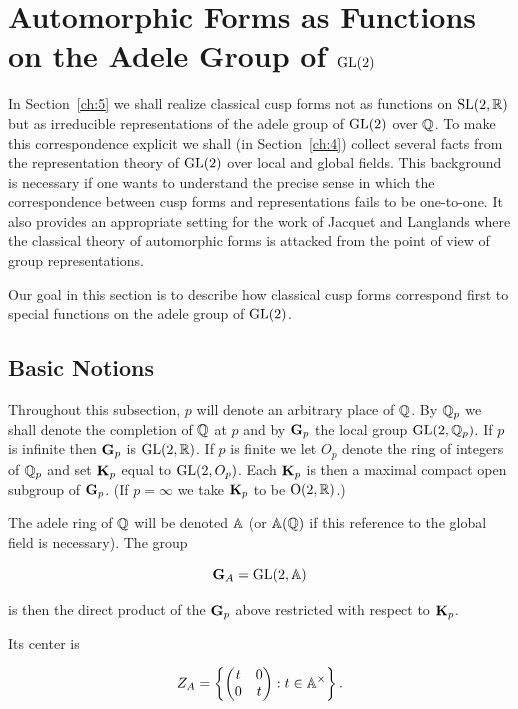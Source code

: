 \chapter{Automorphic Forms as Functions on the Adele Group of \texorpdfstring{$\operatorname{GL}(2)$}{GL(2)}}

\label{ch:3}

In Section~\ref{ch:5} we shall realize classical cusp forms not as functions on $\operatorname{SL}(2,\mathbb{R})$ but as irreducible representations of the adele group of $\operatorname{GL}(2)$ over $\mathbb{Q}$. To make this correspondence explicit we shall (in Section~\ref{ch:4}) collect several facts from the representation theory of $\operatorname{GL}(2)$ over local and global fields. This background is necessary if one wants to understand the precise sense in which the correspondence between cusp forms and representations fails to be one-to-one. It also provides an appropriate setting for the work of Jacquet and Langlands where the classical theory of automorphic forms is attacked from the point of view of group representations.

Our goal in this section is to describe how classical cusp forms correspond first to special functions on the adele group of $\operatorname{GL}(2)$.

\section{Basic Notions}\label{sec:3a}

Throughout this subsection, $p$ will denote an arbitrary place of $\mathbb{Q}$. By $\mathbb{Q}_p$ we shall denote the completion of $\mathbb{Q}$ at $p$ and by $\mathbf{G}_p$ the local group $\operatorname{GL}(2,\mathbb{Q}_p)$. If $p$ is infinite then $\mathbf{G}_p$ is $\operatorname{GL}(2,\mathbb{R})$. If $p$ is finite we let $O_p$ denote the ring of integers of $\mathbb{Q}_p$ and set $\mathbf{K}_p$ equal to $\operatorname{GL}(2,O_p)$. Each $\mathbf{K}_p$ is then a maximal compact open subgroup of $\mathbf{G}_p$. (If $p = \infty$ we take $\mathbf{K}_p$ to be $\operatorname{O}(2,\mathbb{R})$.)

The adele ring of $\mathbb{Q}$ will be denoted $\mathbb{A}$ (or $\mathbb{A}(\mathbb{Q})$ if this reference to the global field is necessary). The group

\[
\mathbf{G}_A = \operatorname{GL}(2,\mathbb{A})
\]

is then the direct product of the $\mathbf{G}_p$ above restricted with respect to $\mathbf{K}_p$.

Its center is

\[
Z_A = \left\{\begin{pmatrix} t & 0 \\ 0 & t \end{pmatrix}: t \in \mathbb{A}^{\times}\right\}.
\]

